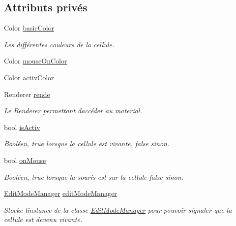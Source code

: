 \subsection*{Attributs privés}
\begin{DoxyCompactItemize}
\item 
Color \mbox{\hyperlink{class_edit_mode_cell_aaf24556f8b30ffb1e373083d8493a899}{basic\+Color}}
\begin{DoxyCompactList}\small\item\em Les différentes couleurs de la cellule. \end{DoxyCompactList}\item 
Color \mbox{\hyperlink{class_edit_mode_cell_a62e856d0c65c55a1ac98a55b40223b6a}{mouse\+On\+Color}}
\item 
Color \mbox{\hyperlink{class_edit_mode_cell_a2e3484f6806cd24f384b787990336fae}{activ\+Color}}
\item 
Renderer \mbox{\hyperlink{class_edit_mode_cell_acb3699318ad91cdc03c0927f288bedc8}{rende}}
\begin{DoxyCompactList}\small\item\em Le Renderer permettant d\textquotesingle{}accéder au material. \end{DoxyCompactList}\item 
bool \mbox{\hyperlink{class_edit_mode_cell_ae89eac1aaea10fb850196b612fe87943}{is\+Activ}}
\begin{DoxyCompactList}\small\item\em Booléen, true lorsque la cellule est vivante, false sinon. \end{DoxyCompactList}\item 
bool \mbox{\hyperlink{class_edit_mode_cell_a4ebd1044db2dccb93529443dae41e3e8}{on\+Mouse}}
\begin{DoxyCompactList}\small\item\em Booléen, true lorsque la souris est sur la cellule false sinon. \end{DoxyCompactList}\item 
\mbox{\hyperlink{class_edit_mode_manager}{Edit\+Mode\+Manager}} \mbox{\hyperlink{class_edit_mode_cell_ae252461bd35c4e41657659411196652e}{edit\+Mode\+Manager}}
\begin{DoxyCompactList}\small\item\em Stocke l\textquotesingle{}instance de la classe \mbox{\hyperlink{class_edit_mode_manager}{Edit\+Mode\+Manager}} pour pouvoir signaler que la cellule est devenu vivante. \end{DoxyCompactList}\item 

\end{DoxyCompactItemize}
